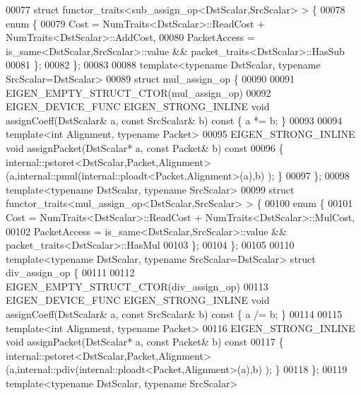 \begin{DoxyCode}
00077 \textcolor{keyword}{struct }functor\_traits<sub\_assign\_op<DstScalar,SrcScalar> > \{
00078   \textcolor{keyword}{enum} \{
00079     Cost = NumTraits<DstScalar>::ReadCost + NumTraits<DstScalar>::AddCost,
00080     PacketAccess = is\_same<DstScalar,SrcScalar>::value && packet\_traits<DstScalar>::HasSub
00081   \};
00082 \};
00083 
00088 \textcolor{keyword}{template}<\textcolor{keyword}{typename} DstScalar, \textcolor{keyword}{typename} SrcScalar=DstScalar>
00089 \textcolor{keyword}{struct }mul\_assign\_op \{
00090 
00091   EIGEN\_EMPTY\_STRUCT\_CTOR(mul\_assign\_op)
00092   EIGEN\_DEVICE\_FUNC EIGEN\_STRONG\_INLINE \textcolor{keywordtype}{void} assignCoeff(DstScalar& a, \textcolor{keyword}{const} SrcScalar& b)\textcolor{keyword}{ const }\{ a *= b; 
      \}
00093   
00094   \textcolor{keyword}{template}<\textcolor{keywordtype}{int} Alignment, \textcolor{keyword}{typename} Packet>
00095   EIGEN\_STRONG\_INLINE \textcolor{keywordtype}{void} assignPacket(DstScalar* a, \textcolor{keyword}{const} Packet& b)\textcolor{keyword}{ const}
00096 \textcolor{keyword}{  }\{ internal::pstoret<DstScalar,Packet,Alignment>(a,internal::pmul(internal::ploadt<Packet,Alignment>(a),b)
      ); \}
00097 \};
00098 \textcolor{keyword}{template}<\textcolor{keyword}{typename} DstScalar, \textcolor{keyword}{typename} SrcScalar>
00099 \textcolor{keyword}{struct }functor\_traits<mul\_assign\_op<DstScalar,SrcScalar> > \{
00100   \textcolor{keyword}{enum} \{
00101     Cost = NumTraits<DstScalar>::ReadCost + NumTraits<DstScalar>::MulCost,
00102     PacketAccess = is\_same<DstScalar,SrcScalar>::value && packet\_traits<DstScalar>::HasMul
00103   \};
00104 \};
00105 
00110 \textcolor{keyword}{template}<\textcolor{keyword}{typename} DstScalar, \textcolor{keyword}{typename} SrcScalar=DstScalar> \textcolor{keyword}{struct }div\_assign\_op \{
00111 
00112   EIGEN\_EMPTY\_STRUCT\_CTOR(div\_assign\_op)
00113   EIGEN\_DEVICE\_FUNC EIGEN\_STRONG\_INLINE \textcolor{keywordtype}{void} assignCoeff(DstScalar& a, \textcolor{keyword}{const} SrcScalar& b)\textcolor{keyword}{ const }\{ a /= b; 
      \}
00114   
00115   \textcolor{keyword}{template}<\textcolor{keywordtype}{int} Alignment, \textcolor{keyword}{typename} Packet>
00116   EIGEN\_STRONG\_INLINE \textcolor{keywordtype}{void} assignPacket(DstScalar* a, \textcolor{keyword}{const} Packet& b)\textcolor{keyword}{ const}
00117 \textcolor{keyword}{  }\{ internal::pstoret<DstScalar,Packet,Alignment>(a,internal::pdiv(internal::ploadt<Packet,Alignment>(a),b)
      ); \}
00118 \};
00119 \textcolor{keyword}{template}<\textcolor{keyword}{typename} DstScalar, \textcolor{keyword}{typename} SrcScalar>

\end{DoxyCode}
